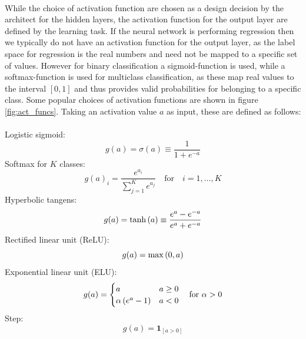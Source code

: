 \\
While the choice of activation function are chosen as a design decision by the architect for the hidden layers, the activation function for the output layer are defined by the learning task. If the neural network is performing regression then we typically do not have an activation function for the output layer, as the label space for regression is the real numbers and need not be mapped to a specific set of values. However for binary classification a sigmoid-function is used, while a softmax-function is used for multiclass classification, as these map real values to the interval $[0,1]$ and thus provides valid probabilities for belonging to a specific class. Some popular choices of activation functions are shown in figure \ref{fig:act_funcs}. Taking an activation value $a$ as input, these are defined as follows:\\
\\
Logistic sigmoid:
\begin{equation} \label{eq:sigmoid}
    g(a) = \sigma(a) \equiv \frac{1}{1 + e^{-a}}
\end{equation}
Softmax for $K$ classes:
\begin{equation*}
    g(a)_i = \frac{e^{a_i}}{\sum_{j=1}^K e^{a_j}} \quad \text{for} \quad i=1 ,\dots, K
\end{equation*}
Hyperbolic tangens:
\begin{equation} \label{eq:tanh}
    g(a) = \tanh \left (a\right) \equiv \frac{e^a - e^{-a}}{e^a + e^{-a}}
\end{equation}
Rectified linear unit (ReLU):
\begin{equation} \label{eq:relu}
    g(a) = \max \left (0, a\right)
\end{equation}
Exponential linear unit (ELU):
\begin{equation*}
    g(a) = \begin{cases}
    a & a \geq 0 \\
    \alpha \left (e^a - 1\right) & a < 0
    \end{cases} \quad \text{for } \alpha > 0
\end{equation*}
Step:
\begin{equation*}
    g(a) = \mathbf{1}_{[a > 0]}
\end{equation*}



